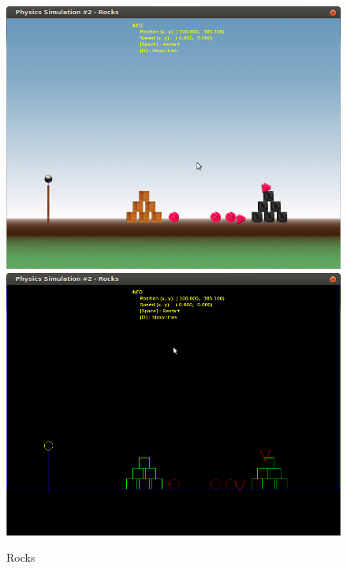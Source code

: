 \begin{figure}[H]
\centering
\caption{Rocks}
  \includegraphics[scale=0.4]{images/rocks.png}
  \includegraphics[scale=0.4]{images/rocksE.png}
\end{figure}


